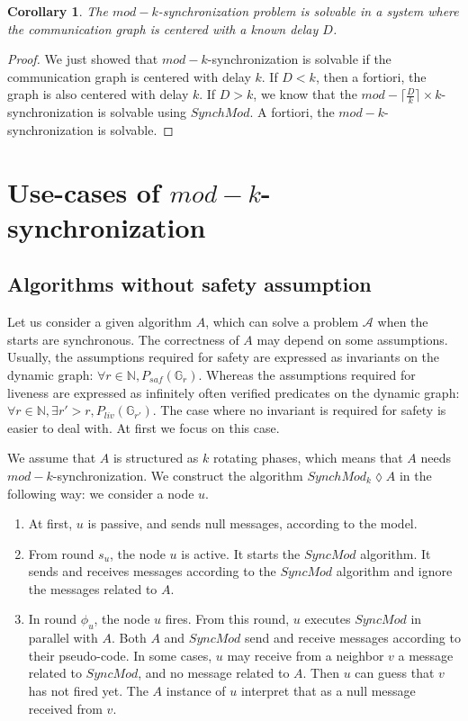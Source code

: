 \documentclass[11pt,letterpaper]{article}
\newtheorem{cor}[thm]{Corollary}
\newcommand{\tf}{\phi}
\begin{document}
\begin{cor}
	The $mod-k$-synchronization problem is solvable in a system where the communication graph is centered with a known delay $D$.
\end{cor}
\begin{proof}
	We just showed that $mod-k$-synchronization is solvable if the communication graph is centered with delay $k$.
	If $D < k$, then a fortiori, the graph is also centered with delay $k$.
	If $D > k$, we know that the $mod-\lceil \frac{D}{k} \rceil \times k$-synchronization is solvable using $SynchMod$.
	A fortiori, the $mod-k$-synchronization is solvable.
\end{proof}

\section{Use-cases of $mod-k$-synchronization}

\subsection{Algorithms without safety assumption}

Let us consider a given algorithm $A$, which can solve a problem $\mathcal{A}$ when the starts are synchronous.
The correctness of $A$ may depend on some assumptions.
Usually, the assumptions required for safety are expressed as invariants on the dynamic graph: $\forall r \in \mathds{N}, P_{saf}(\mathds{G}_r)$.
Whereas the assumptions required for liveness are expressed as infinitely often verified predicates on the dynamic graph: $\forall r \in \mathds{N}, \exists r' > r, P_{liv}(\mathds{G}_{r'})$.
The case where no invariant is required for safety is easier to deal with. At first we focus on this case.

We assume that $A$ is structured as $k$ rotating phases, which means that $A$ needs $mod-k$-synchronization.
We construct the algorithm $SynchMod_k \lozenge A$ in the following way:
we consider a node $u$. 
\begin{enumerate}
	\item At first, $u$ is passive, and sends null messages, according to the model.
	\item From round $s_u$, the node $u$ is active. It starts the $SyncMod$ algorithm. It sends and receives messages according to the $SyncMod$ algorithm and ignore the messages related to $A$.
	\item In round $\tf_u$, the node $u$ fires. From this round, $u$ executes $SyncMod$ in parallel with $A$. Both $A$ and $SyncMod$ send and receive messages according to their pseudo-code.
		In some cases, $u$ may receive from a neighbor $v$ a message related to $SyncMod$, and no message related to $A$. Then $u$ can guess that $v$ has not fired yet.
		The $A$ instance of $u$ interpret that as a null message received from $v$.
\end{enumerate}
\end{document}
